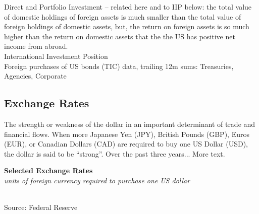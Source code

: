 \documentclass{report}
\makeatletter
\newcommand{\tbllink}[1]{\href{https://raw.githubusercontent.com/bdecon/US-chartbook/master/chartbook/data/#1}{\faTable}}
\newcommand*\short[1]{\expandafter\@gobbletwo\number\numexpr#1\relax}
\newcommand{\stdnode}[3]{\node[below, align=left, shift=({#1,#2})]{#3};}
\newcommand{\dateaxisticks}{
		date coordinates in=x, axis line style={draw=none},
		xmax={2020-02-01},
		max space between ticks=40,	    
		xtick={{1990-01-01}, {1992-01-01}, {1994-01-01}, 
			{1996-01-01}, {1998-01-01}, {2000-01-01}, 
			{2002-01-01}, {2004-01-01}, {2006-01-01},
			{2008-01-01}, {2010-01-01}, {2012-01-01}, {2014-01-01},
		    {2016-01-01}, {2018-01-01}, {2020-01-01}},
		minor xtick={{1989-01-01}, {1991-01-01}, {1993-01-01},
			{1995-01-01}, {1997-01-01}, {1999-01-01}, 
			{2001-01-01}, {2003-01-01}, {2005-01-01}, {2007-01-01},
		    {2009-01-01}, {2011-01-01}, {2013-01-01}, {2015-01-01},
		    {2017-01-01}, {2019-01-01}},
		enlarge y limits={0.06}, enlarge x limits={0.01},
		}
\newcommand{\bbar}[2]{extra #1 ticks = {{#2}}, extra #1 tick labels = ,
		extra #1 tick style = {grid=major, grid style={thick, black!25}},}
\newcommand{\stdline}[4]{\addplot[very thick, no markers, color=#1] 
		table [x=#2, y=#3, col sep=comma] {#4};	}
\newcommand{\rbars}{
		\fill[color=black!10] (axis cs:{1990-07-01},\pgfkeysvalueof{/pgfplots/ymin}) rectangle 
			(axis cs:{1991-03-01}, \pgfkeysvalueof{/pgfplots/ymax});
		\fill[color=black!10] (axis cs:{2007-12-01},\pgfkeysvalueof{/pgfplots/ymin}) rectangle 
			(axis cs:{2009-07-01}, \pgfkeysvalueof{/pgfplots/ymax});
		\fill[color=black!10] (axis cs:{2001-03-01},\pgfkeysvalueof{/pgfplots/ymin}) rectangle 
			(axis cs:{2001-11-01}, \pgfkeysvalueof{/pgfplots/ymax});}
\makeatother
\begin{document}
{{{{\begin{minipage}{0.76\textwidth}
Direct and Portfolio Investment -- related here and to IIP below: the total value of domestic holdings of foreign assets is much smaller than the total value of foreign holdings of domestic assets, but, the return on foreign assets is so much higher than the return on domestic assets that the the US has positive net income from abroad.\\

International Investment Position \\

Foreign purchases of US bonds (TIC) data, trailing 12m sums: Treasuries, Agencies, Corporate

\end{minipage}

\newpage

\begin{minipage}{0.76\textwidth}

\subsection*{\color{black!70} \seriffont Exchange Rates}

\small The strength or weakness of the dollar in an important determinant of trade and financial flows. When more Japanese Yen (JPY), British Pounds (GBP), Euros (EUR), or Canadian Dollars (CAD) are required to buy one US Dollar (USD), the dollar is said to be ``strong''. Over the past three years... More text.\\ 

\vspace{2mm}

\noindent \normalsize \textbf{Selected Exchange Rates}\\
\footnotesize{\textit{units of foreign currency required to purchase one US dollar}}\\
\noindent \hspace*{-2mm} \\
\footnotesize{Source: Federal Reserve} \hfill \tbllink{fx1.csv}\\


\end{minipage}}}}}
\end{document}
